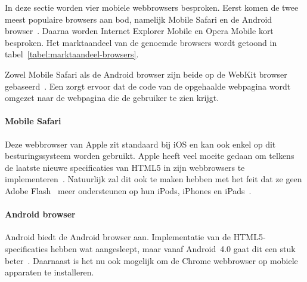 In deze sectie worden vier mobiele webbrowsers besproken. 
Eerst komen de twee meest populaire browsers aan bod, namelijk Mobile Safari en de  Android browser~\cite{Hales2012}. 
Daarna worden Internet Explorer Mobile en Opera Mobile kort besproken. 
Het marktaandeel van de genoemde browsers wordt getoond in tabel~\ref{tabel:marktaandeel-browsers}.

Zowel Mobile Safari als de  Android browser zijn beide op de WebKit browser  gebaseerd~\cite{Oeflman2011}. 
Een  zorgt ervoor dat de code van de opgehaalde webpagina wordt omgezet naar de webpagina die de gebruiker te zien krijgt. 

\begin{table}[H]
\centering
{}
\caption{Marktaandeel mobiele webbrowsers op mei 2013~\cite{NetApplications2012}.}
\label{tabel:marktaandeel-browsers}
\end{table}

\paragraph{Mobile Safari}
\label{sec:mobile-safari}
Deze webbrowser van Apple zit standaard bij iOS en kan ook enkel op dit besturingssysteem worden gebruikt. 
Apple heeft veel moeite gedaan om telkens de laatste nieuwe specificaties van HTML5 in zijn webbrowsers te implementeren~\cite{Hales2012}. 
Natuurlijk zal dit ook te maken hebben met het feit dat ze geen Adobe Flash~\cite{Adobe2013} meer ondersteunen op hun iPods, iPhones en iPads~\cite{Jobs2010}.

\paragraph{Android browser}
\label{sec:android-browser}
Android biedt de  Android browser aan. 
Implementatie van de HTML5-specificaties hebben wat aangesleept, maar vanaf Android~4.0 gaat dit een stuk beter~\cite{Hales2012}. 
Daarnaast is het nu ook mogelijk om de Chrome webbrowser op mobiele apparaten te installeren.


